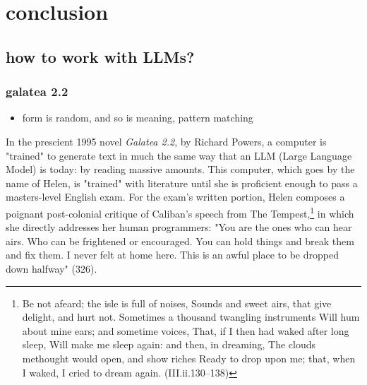 \documentclass[11pt]{article}
\author{Filipa  Calado}
\date{\today}
\title{}
\begin{document}
\tableofcontents

\section{conclusion}
\label{sec:org6243f8e}

\subsection{how to work with LLMs?}
\label{sec:org73e65ae}
\subsubsection{galatea 2.2}
\label{sec:org4b6c4d5}
\begin{itemize}
\item form is random, and so is meaning, pattern matching
\end{itemize}

In the prescient 1995 novel \emph{Galatea 2.2}, by Richard Powers, a
computer is "trained" to generate text in much the same way that an
LLM (Large Language Model) is today: by reading massive amounts. This
computer, which goes by the name of Helen, is "trained" with
literature until she is proficient enough to pass a masters-level
English exam. For the exam's written portion, Helen composes a
poignant post-colonial critique of Caliban's speech from The
Tempest,\footnote{Be not afeard; the isle is full of noises,
Sounds and sweet airs, that give delight, and hurt not.
Sometimes a thousand twangling instruments
Will hum about mine ears; and sometime voices,
That, if I then had waked after long sleep,
Will make me sleep again: and then, in dreaming,
The clouds methought would open, and show riches
Ready to drop upon me; that, when I waked,
I cried to dream again. (III.ii.130–138)} in which she directly addresses her human programmers:
"You are the ones who can hear airs. Who can be frightened or
encouraged. You can hold things and break them and fix them. I never
felt at home here. This is an awful place to be dropped down halfway"
(326).
\end{document}
